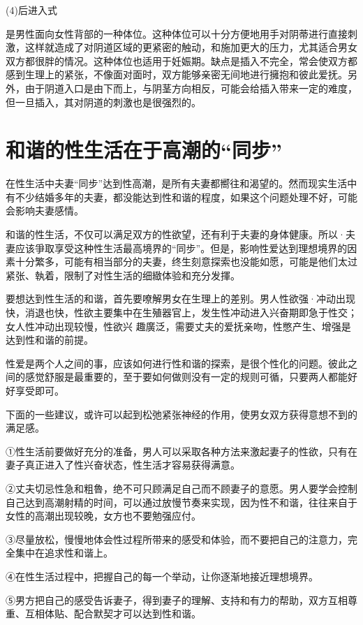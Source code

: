 \documentclass[12pt,UTF8]{ctexbook}
\begin{document}
(4)后进入式

是男性面向女性背部的一种体位。这种体位可以十分方便地用手对阴蒂进行直接刺激，这样就造成了对阴道区域的更紧密的触动，和施加更大的压力，尤其适合男女双方都很胖的情况。这种体位也适用于妊娠期。缺点是插入不完全，常会使双方都感到生理上的紧张，不像面对面时，双方能够亲密无间地进行擁抱和彼此爱抚。另外，由于阴道入口是由下而上，与阴茎方向相反，可能会给插入带来一定的难度，但一旦插入，其对阴道的刺激也是很强烈的。

\section{和谐的性生活在于高潮的“同步”}

在性生活中夫妻“同步”达到性高潮，是所有夫妻都嚮往和渴望的。然而现实生活中有不少结婚多年的夫妻，都没能达到性和谐的程度，如果这个问题处理不好，可能会影响夫妻感情。

和谐的性生活，不仅可以满足双方的性欲望，还有利于夫妻的身体健康。所以·夫妻应该爭取享受这种性生活最高境界的“同步”。但是，影响性爱达到理想境界的因素十分繁多，可能有相当部分的夫妻，终生刻意探索也没能如愿，可能是他们太过紧张、執着，限制了对性生活的细緻体验和充分发揮。

要想达到性生活的和谐，首先要嘹解男女在生理上的差别。男人性欲强·冲动出现快，消退也快，性欲主要集中在生殖器官上，发生性冲动进入兴奋期即急于性交；女人性冲动出现较慢，性欲兴
趣廣泛，需要丈夫的爱抚亲吻，性憋产生、增强是达到性和谐的前提。

性爱是两个人之间的事，应该如何进行性和谐的探索，是很个性化的问题。彼此之间的感觉舒服是最重要的，至于要如何做则没有一定的规则可循，只要两人都能好好享受即可。

下面的一些建议，或许可以起到松弛紧张神经的作用，使男女双方获得意想不到的满足感。

①性生活前要做好充分的准备，男人可以采取各种方法来激起妻子的性欲，只有在妻子真正进入了性兴奋状态，性生活才容易获得满意。

②丈夫切忌性急和粗魯，绝不可只顾满足自己而不顾妻子的意愿。男人要学会控制自己达到高潮射精的时间，可以通过放慢节奏来实现，因为性不和谐，往往来自于女性的高潮出现较晚，女方也不要勉强应付。

③尽量放松，慢慢地体会性过程所带来的感受和体验，而不要把自己的注意力，完全集中在追求性和谐上。

④在性生活过程中，把握自己的每一个举动，让你逐渐地接近理想境界。

⑤男方把自己的感受告诉妻子，得到妻子的理解、支持和有力的帮助，双方互相尊重、互相体贴、配合默契才可以达到性和谐。
\end{document}
